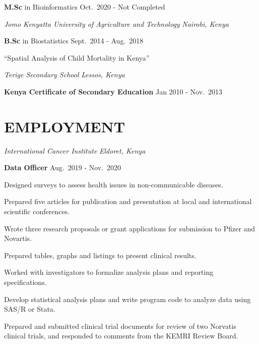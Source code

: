 \documentclass[13pt,]{article}
\providecommand{\tightlist}{%
  \setlength{\itemsep}{0pt}\setlength{\parskip}{0pt}}
\renewenvironment{itemize}{
  \begin{list}{}{
    \setlength{\leftmargin}{1.5em}
  }
}{
  \end{list}
}
\begin{document}
\begin{itemize}
\tightlist
\item
  \textbf{M.Sc} in Bioinformatics \hfill Oct.~2020 - Not Completed
\end{itemize}

\emph{Jomo Kenyatta University of Agriculture and Technology}
\hfill \emph{Nairobi, Kenya}

\begin{itemize}
\item
  \textbf{B.Sc} in Biostatistics \hfill Sept.~2014 - Aug.~2018

  \begin{itemize}
  \tightlist
  \item
    ``Spatial Analysis of Child Mortality in Kenya''
  \end{itemize}
\end{itemize}

\emph{Terige Secondary School} \hfill \emph{Lessos, Kenya}

\begin{itemize}
\tightlist
\item
  \textbf{Kenya Certificate of Secondary Education} \hfill Jan 2010 -
  Nov.~2013
\end{itemize}

\hypertarget{employment}{%
\section{\texorpdfstring{\textbf{EMPLOYMENT}}{EMPLOYMENT}}\label{employment}}

\emph{International Cancer Institute} \hfill \emph{Eldoret, Kenya}

\textbf{Data Officer} \hfill Aug.~2019 - Nov.~2020

\begin{itemize}
\tightlist
\item
  Designed surveys to assess health issues in non-communicable diseases.
\item
  Prepared five articles for publication and presentation at local and
  international scientific conferences.
\item
  Wrote three research proposals or grant applications for submission to
  Pfizer and Novartis.
\item
  Prepared tables, graphs and listings to present clinical results.
\item
  Worked with investigators to formalize analysis plans and reporting
  specifications.
\item
  Develop statistical analysis plans and write program code to analyze
  data using SAS/R or Stata.
\item
  Prepared and submitted clinical trial documents for review of two
  Norvatis clinical trials, and responded to comments from the KEMRI
  Review Board.
\end{itemize}
\end{document}
